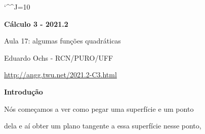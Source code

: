 \documentclass[oneside,12pt]{article}
\begin{document}
\catcode`\^^J=10

\pu


\def\u#1{\par{\footnotesize \url{#1}}}

\def\thompsonpage#1{{\scriptsize
\url{https://www.gutenberg.org/files/33283/33283-pdf.pdf\#page=#1}
}}

\def\pictgray#1{{\color{GrayPale}\linethickness{0.3pt}#1}}

\def\drafturl{http://angg.twu.net/LATEX/2021-2-C3.pdf}
\def\drafturl{http://angg.twu.net/2021.2-C3.html}
\def\draftfooter{\tiny \href{\drafturl}{\jobname{}} \ColorBrown{\shorttoday{} \hours}}



%

\thispagestyle{empty}

\begin{center}

\vspace*{1.2cm}

{\bf \Large Cálculo 3 - 2021.2}

\bsk

Aula 17: algumas funções quadráticas

\bsk

Eduardo Ochs - RCN/PURO/UFF

\url{http://angg.twu.net/2021.2-C3.html}

\end{center}

\newpage

{\bf Introdução}

Nós começamos a ver como pegar uma superfície e um ponto

dela e aí obter um plano tangente a essa superfície nesse ponto,
\end{document}

